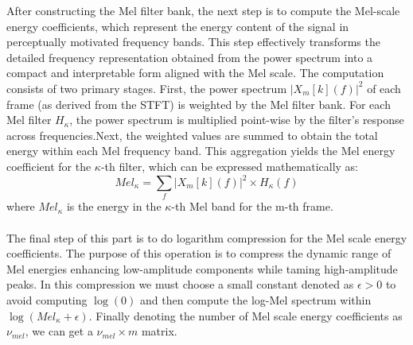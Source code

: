 After constructing the Mel filter bank, the next step is to compute the Mel-scale energy coefficients, which represent the energy content of the signal in perceptually motivated frequency bands. This step effectively transforms the detailed frequency representation obtained from the power spectrum into a compact and interpretable form aligned with the Mel scale. The computation consists of two primary stages. First, the power spectrum $|X_m[k](f)|^2$ of each frame (as derived from the STFT) is weighted by the Mel filter bank. For each Mel filter $H_{\kappa}$, the power spectrum is multiplied point-wise by the filter’s response across frequencies.Next, the weighted values are summed to obtain the total energy within each Mel frequency band. This aggregation yields the Mel energy coefficient for the $\kappa$-th filter, which can be expressed mathematically as:\\
\begin{equation}
Mel_{\kappa}=\sum_{f} |X_m[k](f)|^2 \times H_{\kappa}(f)
\end{equation}
where $Mel_{\kappa}$ is the energy in the $\kappa$-th Mel band for the m-th frame.\\ 
\\
The final step of this part is to do logarithm compression for the Mel scale energy coefficients. The purpose of this operation is to compress the dynamic range of Mel energies enhancing low-amplitude components while taming high-amplitude peaks. In this compression we must choose a small constant denoted as $\epsilon>0$ to avoid computing $\log(0)$ and then compute the log-Mel spectrum within $\log(Mel_{\kappa}+\epsilon)$. Finally denoting the number of Mel scale energy coefficients as $\nu_{mel}$, we can get a $\nu_{mel} \times m$ matrix.\\
